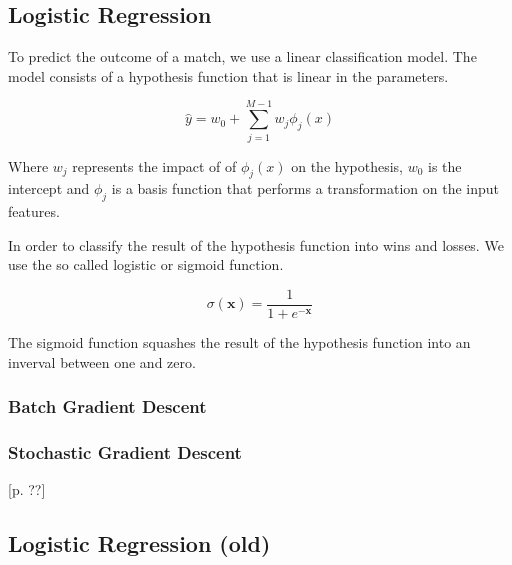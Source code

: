 \subsection{Logistic Regression}\label{sec:logistic}

To predict the outcome of a match, we use a linear classification model.
The model consists of a hypothesis function that is linear in the parameters.

$$\hat{y} = w_0 + \sum_{j=1}^{M-1} w_j \phi_j(x)$$

Where $w_j$ represents the impact of of $\phi_j(x)$ on the hypothesis,
$w_0$ is the intercept and $\phi_j$ is a basis function that
performs a transformation on the input features. 

In order to classify the result of the hypothesis function into wins and losses. 
We use the so called logistic or sigmoid function.


$$\sigma(\textbf{x}) = \frac{1}{1+e^{- \textbf{x}}}$$

The sigmoid function squashes the result of the hypothesis function into an inverval between one and zero.






 

\subsubsection{Batch Gradient Descent}

\subsubsection{Stochastic Gradient Descent}\label{sec:stochastic}




\begin{flushright}
\cite{Bishop2006}[p. ??]
\end{flushright}


\subsection{Logistic Regression (old)}

